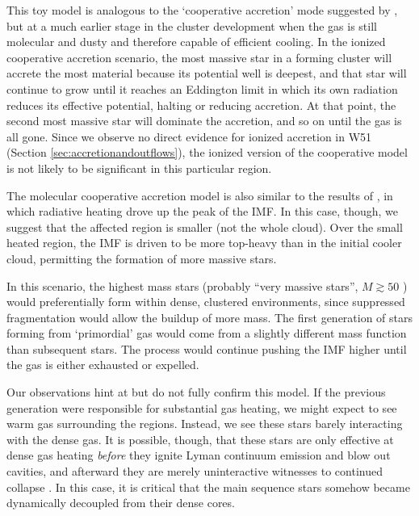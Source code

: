 \documentclass{emulateapj}
\begin{document}
This toy model is analogous to the `cooperative accretion' mode suggested by
\citet{Zinnecker2007a}, but at a much earlier stage in the cluster development
when the gas is still molecular and dusty and therefore capable of efficient
cooling.  In the ionized cooperative accretion scenario, the most massive
star in a forming cluster will accrete the most material because its potential
well is deepest, and that star will continue to grow until it reaches an
Eddington limit in which its own radiation reduces its effective potential,
halting or reducing accretion.  At that point, the second most massive star
will dominate the accretion, and so on until the gas is all gone.  Since
we observe no direct evidence for ionized accretion in W51 (Section
\ref{sec:accretionandoutflows}), the ionized version of the cooperative model
is not likely to be significant in this particular region.


The molecular cooperative accretion model is also similar to the results of
\citet{Krumholz2011a}, in which radiative heating drove up the peak of the IMF.
In this case, though, we suggest that the affected region is smaller (not the
whole cloud).  Over the small heated region, the IMF is driven to be more
top-heavy than in the initial cooler cloud, permitting the formation of more
massive stars.

In this scenario, the highest mass stars (probably ``very massive stars'',
$M\gtrsim50$ \msun) would preferentially form within dense, clustered
environments, since suppressed fragmentation would allow the buildup of
more mass.  The first generation of stars forming from `primordial' gas
would come from a slightly different mass function than subsequent stars.  The
process would continue pushing the IMF higher until the gas is either exhausted
\citep{Kruijssen2012b,Ginsburg2016b} or expelled.

Our observations hint at but do not fully confirm this model.  If the
previous generation were responsible for substantial gas heating, we might
expect to see warm gas surrounding the \hchii regions.  Instead, we see these
stars barely interacting with the dense gas.  It is possible, though, that
these stars are only effective at dense gas heating \emph{before} they ignite
Lyman continuum emission and blow out cavities, and afterward they are merely
uninteractive witnesses to continued collapse \citep{Peters2010c}.  In this case,
it is critical that the main sequence stars somehow became dynamically
decoupled from their dense cores.
\end{document}
